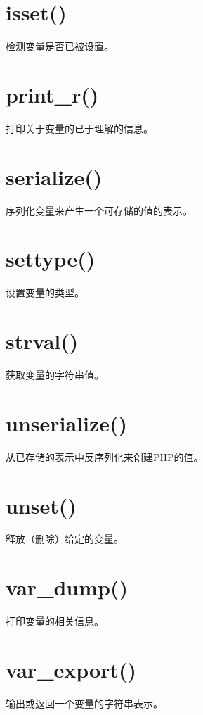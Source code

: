 \section{isset()}

检测变量是否已被设置。

\section{print\_r()}

打印关于变量的已于理解的信息。

\section{serialize()}

序列化变量来产生一个可存储的值的表示。

\section{settype()}

设置变量的类型。

\section{strval()}

获取变量的字符串值。

\section{unserialize()}

从已存储的表示中反序列化来创建PHP的值。

\section{unset()}

释放（删除）给定的变量。

\section{var\_dump()}

打印变量的相关信息。

\section{var\_export()}


输出或返回一个变量的字符串表示。




























